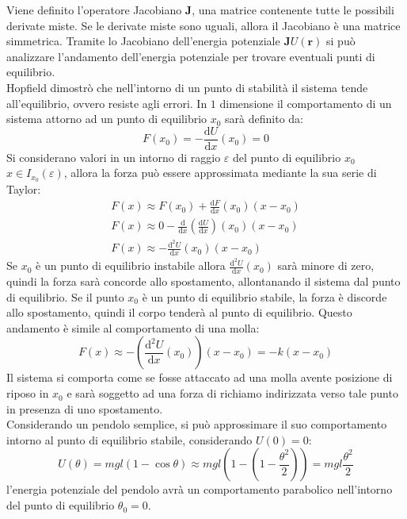 \documentclass{article}
\newcommand{\vect}[1]{\boldsymbol{\mathbf{#1}}}
\newcommand{\df}{\mathrm{d}}
\numberwithin{equation}{subsection}
\begin{document}
Viene definito l'operatore Jacobiano $\vect{J}$, una matrice contenente tutte 
le possibili derivate miste. Se le derivate miste sono uguali, 
allora il Jacobiano è una matrice simmetrica. Tramite lo 
Jacobiano dell'energia potenziale $\vect{J}U(\vect{r})$ si può analizzare l'andamento dell'energia potenziale per trovare eventuali punti di equilibrio. 
\\
Hopfield dimostrò che nell'intorno di un punto di stabilità 
il sistema tende all'equilibrio, ovvero resiste agli errori. 
In $1$ dimensione il comportamento di un sistema attorno ad un 
punto di equilibrio $x_0$ sarà definito da:
\begin{equation}
    F(x_0)=-\displaystyle\frac{\df U}{\df x}(x_0)=0
\end{equation}
Si considerano valori in un intorno di raggio $\varepsilon$ del punto di equilibrio $x_0$ $x\in I_{x_0}(\varepsilon)$, allora la forza può 
essere approssimata mediante la sua serie di Taylor:
\begin{gather*}
    F(x)\approx F(x_0)+\displaystyle\frac{\df F}{\df x}(x_0)(x-x_0)\\
    F(x)\approx 0-\displaystyle\frac{\df}{\df x}\left(\frac{\df U}{\df x}\right)(x_0)(x-x_0)\\
    F(x)\approx -\displaystyle\frac{\df^{2}U}{\df x}(x_0)(x-x_0)
\end{gather*}
Se $x_0$ è un punto di equilibrio instabile allora $\displaystyle\frac{\df^{2}U}{\df x}(x_0)$ 
sarà minore di zero, quindi la forza sarà concorde allo 
spostamento, allontanando il sistema dal punto di equilibrio. 
Se il punto $x_0$ è un punto di equilibrio stabile, 
la forza è discorde allo spostamento, quindi 
il corpo tenderà al punto di equilibrio. Questo andamento  
è simile al comportamento di una molla:
\begin{equation}
    F(x)\approx -\left(\displaystyle\frac{\df^{2}U}{\df x}(x_0)\right)(x-x_0)=-k(x-x_0)
\end{equation}
Il sistema si comporta come se fosse attaccato ad una molla avente 
posizione di riposo in $x_0$ e sarà soggetto ad una forza di 
richiamo indirizzata verso tale punto in presenza di uno 
spostamento. 
\\
Considerando un pendolo semplice, si può approssimare il suo comportamento intorno al punto di equilibrio stabile, considerando $U(0)=0$: 
\begin{equation*}
    U(\theta) = mgl(1-\cos\theta)\approx mgl\left(1-\left(1-\displaystyle\frac{\theta^{2}}{2}\right)\right)=mgl\frac{\theta^2}{2}
\end{equation*}
l'energia potenziale del pendolo avrà un comportamento parabolico 
nell'intorno del punto di equilibrio $\theta_0=0$.
\end{document}
